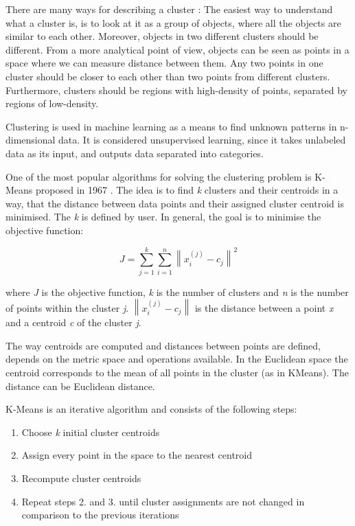 There are many ways for describing a cluster \cite{clustering}: The easiest way to understand what a cluster is, is to look at it as a group of objects, where all the objects are similar to each other. Moreover, objects in two different clusters should be different. From a more analytical point of view, objects can be seen as points in a space where we can measure distance between them. Any two points in one cluster should be closer to each other than two points from different clusters. Furthermore, clusters should be regions with high-density of points, separated by regions of low-density.

Clustering is used in machine learning as a means to find unknown patterns in n-dimensional data. It is considered unsupervised learning, since it takes unlabeled data as its input, and outputs data separated into categories. 

One of the most popular algorithms for solving the clustering problem is K-Means proposed in 1967 \cite{macqueen1967}. The idea is to find \textit{k} clusters and their centroids in a way, that the distance between data points and their assigned cluster centroid is minimised. The \textit{k} is defined by user. In general, the goal is to minimise the objective function:

\begin{equation}
\label{eq:objective-kmeans}
    J = \sum_{j=1}^{k}\sum_{i=1}^{n}\left \| x_{i}^{(j)}-c_{j} \right \|^{2}
\end{equation}

where \textit{J} is the objective function, \textit{k} is the number of clusters and \textit{n} is the number of points within the cluster \textit{j}. $\left \| x_{i}^{(j)}-c_{j} \right \|$ is the distance between a point \textit{x} and a centroid \textit{c} of the cluster \textit{j}.

The way centroids are computed and distances between points are defined, depends on the metric space and operations available. In the Euclidean space the centroid corresponds to the mean of all points in the cluster (as in KMeans). The distance can be Euclidean distance. 

K-Means is an iterative algorithm and consists of the following steps:

\begin{enumerate}
  \item Choose \textit{k} initial cluster centroids
  \item Assign every point in the space to the nearest centroid
  \item Recompute cluster centroids
  \item Repeat steps 2. and 3. until cluster assignments are not changed in comparison to the previous iterations
\end{enumerate}

